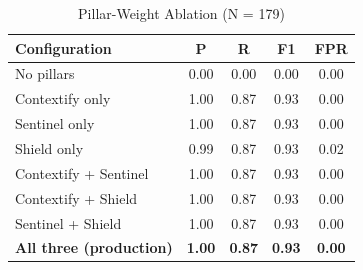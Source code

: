 \documentclass[journal]{IEEEtran}
\begin{document}
\begin{table}[t]
\caption{Pillar-Weight Ablation (N = 179)}
\label{tab:ablation}
\centering
\begin{tabular}{@{}lcccc@{}}
\toprule
\textbf{Configuration} & \textbf{P} & \textbf{R} & \textbf{F1} & \textbf{FPR} \\
\midrule
No pillars              & 0.00 & 0.00 & 0.00 & 0.00 \\
Contextify only         & 1.00 & 0.87 & 0.93 & 0.00 \\
Sentinel only           & 1.00 & 0.87 & 0.93 & 0.00 \\
Shield only             & 0.99 & 0.87 & 0.93 & 0.02 \\
Contextify + Sentinel   & 1.00 & 0.87 & 0.93 & 0.00 \\
Contextify + Shield     & 1.00 & 0.87 & 0.93 & 0.00 \\
Sentinel + Shield       & 1.00 & 0.87 & 0.93 & 0.00 \\
\textbf{All three (production)} & \textbf{1.00} & \textbf{0.87} & \textbf{0.93} & \textbf{0.00} \\
\bottomrule
\end{tabular}
\end{table}
\end{document}
